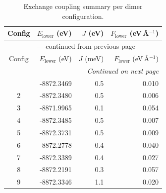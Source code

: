 
\begin{longtable}{@{}crrr@{}}
\caption{Exchange coupling summary per dimer configuration.}
\label{tab:exchange_couplings}\\
\toprule
Config & $E_{\mathrm{lower}}$ (eV) & $J$ (eV) & $F_{\mathrm{lower}}$ (eV\,\AA$^{-1}$)\\
\midrule
\endfirsthead
\multicolumn{4}{c}{{\tablename}~\thetable{} --- continued from previous page}\\
\toprule
Config & $E_{\mathrm{lower}}$ (eV) & $J$ (meV) & $F_{\mathrm{lower}}$ (eV\,\AA$^{-1}$)\\
\midrule
\endhead
\midrule
\multicolumn{4}{r}{\emph{Continued on next page}}\\
\endfoot
\bottomrule
\endlastfoot
1 & -8872.3469 & 0.5 & 0.010 \\ 
2 & -8872.3480 & 0.5 & 0.006 \\ 
3 & -8871.9965 & 0.1 & 0.054 \\ 
4 & -8872.3485 & 0.5 & 0.007 \\ 
5 & -8872.3731 & 0.5 & 0.009 \\ 
6 & -8872.2778 & 0.4 & 0.040 \\ 
7 & -8872.3389 & 0.4 & 0.027 \\ 
8 & -8872.2191 & 0.3 & 0.057 \\ 
9 & -8872.3346 & 1.1 & 0.020 \\ 
\end{longtable}